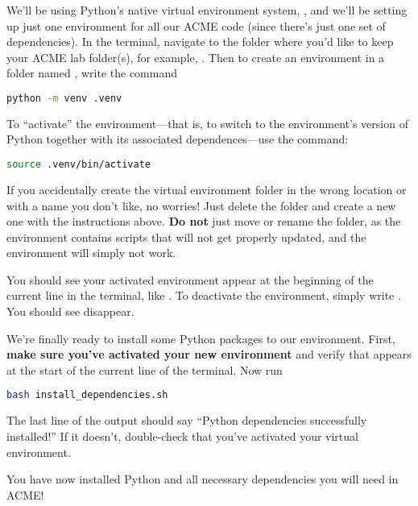 We'll be using Python's native virtual environment system, , and we'll be setting up just one environment for all our ACME code (since there's just one set of dependencies).
In the terminal, navigate to the folder where you'd like to keep your ACME lab folder(s), for example, .
Then to create an environment in a folder named , write the command
\begin{lstlisting}[language=bash]
python -m venv .venv
\end{lstlisting}
To ``activate'' the environment---that is, to switch to the environment's version of Python together with its associated dependences---use the  command:
\begin{lstlisting}[language=bash]
source .venv/bin/activate
\end{lstlisting}
\begin{info}
    If you accidentally create the virtual environment folder in the wrong location or with a name you don't like, no worries!
    Just delete the folder and create a new one with the instructions above.
    \textbf{Do not} just move or rename the folder, as the environment contains scripts that will not get properly updated, and the environment will simply not work.
\end{info}
You should see your activated environment  appear at the beginning of the current line in the terminal, like \mbox{}.
To deactivate the environment, simply write .
You should see  disappear.

We're finally ready to install some Python packages to our environment.
First, \textbf{make sure you've activated your new environment} and verify that  appears at the start of the current line of the terminal.
Now run
\begin{lstlisting}[language=bash]
bash install_dependencies.sh
\end{lstlisting}
The last line of the output should say ``Python dependencies successfully installed!''
If it doesn't, double-check that you've activated your virtual environment.

You have now installed Python and all necessary dependencies you will need in ACME!

